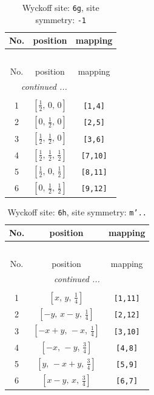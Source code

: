 \documentclass[fleqn,8pt]{jsarticle}
\begin{document}
\renewcommand{\arraystretch}{1.2}
\begin{longtable}{ccc}
\caption{Wyckoff site: {\tt 6g}, site symmetry: {\tt -1}}
 \\
 \hline \hline
No. & position & mapping \\ \hline \endfirsthead

\multicolumn{2}{l}{\tablename\ \thetable{}} \\
 \hline \hline
No. & position & mapping \\ \hline \endhead

 \hline \hline
\multicolumn{2}{r}{\footnotesize\it continued ...} \\ \endfoot

 \hline \hline
\multicolumn{2}{r}{} \\ \endlastfoot

1 & $\left[ \frac{1}{2},\, 0,\, 0 \right]$ & {\tt [1,4]} \\ \hline
2 & $\left[ 0,\, \frac{1}{2},\, 0 \right]$ & {\tt [2,5]} \\ \hline
3 & $\left[ \frac{1}{2},\, \frac{1}{2},\, 0 \right]$ & {\tt [3,6]} \\ \hline
4 & $\left[ \frac{1}{2},\, \frac{1}{2},\, \frac{1}{2} \right]$ & {\tt [7,10]} \\ \hline
5 & $\left[ \frac{1}{2},\, 0,\, \frac{1}{2} \right]$ & {\tt [8,11]} \\ \hline
6 & $\left[ 0,\, \frac{1}{2},\, \frac{1}{2} \right]$ & {\tt [9,12]} \\
\end{longtable}
\renewcommand{\arraystretch}{1.2}
\begin{longtable}{ccc}
\caption{Wyckoff site: {\tt 6h}, site symmetry: {\tt m'..}}
 \\
 \hline \hline
No. & position & mapping \\ \hline \endfirsthead

\multicolumn{2}{l}{\tablename\ \thetable{}} \\
 \hline \hline
No. & position & mapping \\ \hline \endhead

 \hline \hline
\multicolumn{2}{r}{\footnotesize\it continued ...} \\ \endfoot

 \hline \hline
\multicolumn{2}{r}{} \\ \endlastfoot

1 & $\left[ x,\, y,\, \frac{1}{4} \right]$ & {\tt [1,11]} \\ \hline
2 & $\left[ - y,\, x - y,\, \frac{1}{4} \right]$ & {\tt [2,12]} \\ \hline
3 & $\left[ - x + y,\, - x,\, \frac{1}{4} \right]$ & {\tt [3,10]} \\ \hline
4 & $\left[ - x,\, - y,\, \frac{3}{4} \right]$ & {\tt [4,8]} \\ \hline
5 & $\left[ y,\, - x + y,\, \frac{3}{4} \right]$ & {\tt [5,9]} \\ \hline
6 & $\left[ x - y,\, x,\, \frac{3}{4} \right]$ & {\tt [6,7]} \\
\end{longtable}
\end{document}

